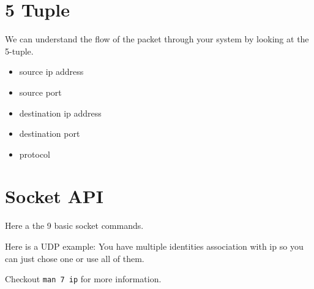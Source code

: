 \documentclass[12pt]{article}
\begin{document}

\section{5 Tuple} %
\label{sec:5_tuple}
We can understand the flow of the packet through your system by looking at the 5-tuple. 
\begin{itemize}
	\item source ip address
	\item source port
	\item destination ip address
	\item destination port
	\item protocol
\end{itemize}
		


\section{Socket API} %
\label{sec:socket_api}
Here a the 9 basic socket commands.

Here is a UDP example:
You have multiple identities association with ip so you can just chose one or use all of them. 

Checkout \texttt{man 7 ip} for more information.
\end{document}
